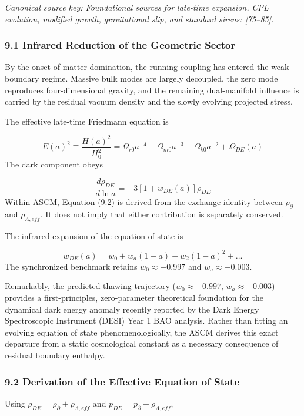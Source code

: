 \documentclass[aps,prd,onecolumn,superscriptaddress,nofootinbib,longbibliography,10pt]{revtex4-2}
\begin{document}
  \textit{Canonical source key: Foundational sources for late-time expansion, CPL evolution, modified growth, gravitational slip, and standard sirens: [75–85].}


  
\subsubsection*{9.1 Infrared Reduction of the Geometric Sector}

  By the onset of matter domination, the running coupling has entered the weak-boundary regime. Massive bulk modes are largely decoupled, the zero mode reproduces four-dimensional gravity, and the remaining dual-manifold influence is carried by the residual vacuum density and the slowly evolving projected stress.


  The effective late-time Friedmann equation is


  \[ E(a)^2 \equiv \frac{H(a)^2}{H_0^2} = \Omega_{r0} a^{-4} + \Omega_{m0} a^{-3} + \Omega_{k0} a^{-2} + \Omega_{DE}(a) \]
  The dark component obeys


  \[ \frac{d\rho_{DE}}{d\ln a} = -3[1 + w_{DE}(a)]\rho_{DE} \]
  Within ASCM, Equation (9.2) is derived from the exchange identity between \(\rho_\partial\) and \(\rho_{\Lambda,eff}\). It does not imply that either contribution is separately conserved.


  The infrared expansion of the equation of state is


  \[ w_{DE}(a) = w_0 + w_a(1 - a) + w_2(1 - a)^2 + \dots \]
  The synchronized benchmark retains \(w_0 \approx -0.997\) and \(w_a \approx -0.003\).


Remarkably, the predicted thawing trajectory (\(w_0 \approx -0.997\), \(w_a \approx -0.003\)) provides a first-principles, zero-parameter theoretical foundation for the dynamical dark energy anomaly recently reported by the Dark Energy Spectroscopic Instrument (DESI) Year 1 BAO analysis. Rather than fitting an evolving equation of state phenomenologically, the ASCM derives this exact departure from a static cosmological constant as a necessary consequence of residual boundary enthalpy.



  
\subsubsection*{9.2 Derivation of the Effective Equation of State}

  Using \(\rho_{DE} = \rho_\partial + \rho_{\Lambda,eff}\) and \(p_{DE} = p_\partial - \rho_{\Lambda,eff}\),
\end{document}
